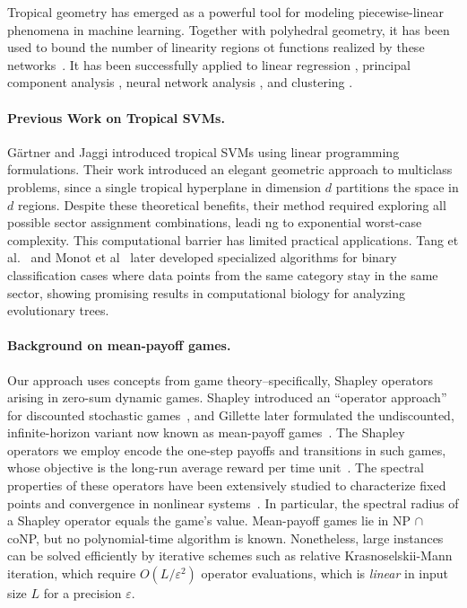 \documentclass{article}
\begin{document}
Tropical geometry has emerged as a powerful tool for modeling piecewise-linear phenomena in machine learning. Together with polyhedral geometry,
it has been used to bound the number of linearity regions ot functions realized by these networks~\cite{zhang2018,montufar}.
It has been successfully applied to linear regression \cite{maragos2020,akian2020}, principal component analysis \cite{yoshida2019}, neural network analysis \cite{maragos2021}, and clustering \cite{monod2022}.

\paragraph{Previous Work on Tropical SVMs.} Gärtner and Jaggi \cite{gartner2008} introduced tropical SVMs using linear programming formulations. Their work introduced an elegant geometric approach to multiclass problems, since a single tropical hyperplane in dimension $d$ partitions the space in $d$ regions.
Despite these theoretical benefits, their method required exploring all possible sector assignment combinations, leadi
ng to exponential worst-case complexity. This computational barrier has limited practical applications.
Tang et al.~\cite{tang2020} and Monot et al~\cite{monod2022} later developed specialized algorithms for binary classification cases where data points from the same category stay in the same sector, showing promising results in computational biology for analyzing evolutionary trees.

\paragraph{Background on mean‐payoff games.}
Our approach uses concepts from game theory--specifically, Shapley operators arising in zero-sum dynamic games.
Shapley introduced an ``operator approach'' for discounted stochastic games~\cite{shapley1953}, and Gillette later formulated the undiscounted, infinite-horizon variant now known as mean-payoff games~\cite{gillette1957}.
The Shapley operators we employ encode the one-step payoffs and transitions in such games, whose objective is the long-run average reward per time unit~\cite{zwick1996}. 
The spectral properties of these operators have been extensively studied to characterize fixed points and convergence in nonlinear systems~\cite{kolokoltsov1997,gaubert2004}.
In particular, the spectral radius of a Shapley operator equals the game's value.
Mean-payoff games lie in NP $\cap$ coNP, but no polynomial-time algorithm is known.
Nonetheless, large instances can be solved efficiently by iterative schemes such as relative Krasnoselskii-Mann iteration, which require $O(L/\varepsilon^2)$ operator evaluations, which is \emph{linear} in input size $L$ for a precision $\varepsilon$.
\end{document}
